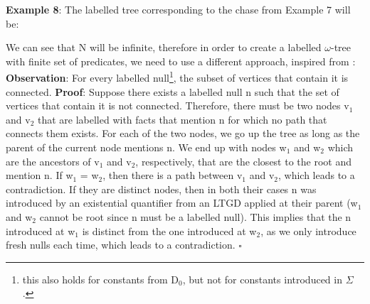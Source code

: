 \documentclass[11pt, a4paper, dvipsnames]{article}
\begin{document}
\textbf{Example 8}: The labelled tree corresponding to the chase from Example 7 will be:\newline
\begin{center}
\end{center}
We can see that N will be infinite, therefore in order to create a labelled $\omega$-tree with finite set of predicates, we need to use a different approach, inspired from \cite{decidable}: \newline
\textbf{Observation}: For every labelled null\footnote{this also holds for constants from D$_{0}$, but not for constants introduced in $\Sigma$.}, the subset of vertices that contain it is connected. \newline
\textbf{Proof}: Suppose there exists a labelled null n such that the set of vertices that contain it is not connected. Therefore, there must be two nodes v$_{1}$ and v$_{2}$ that are labelled with facts that mention n for which no path that connects them exists. For each of the two nodes, we go up the tree as long as the parent of the current node mentions n. We end up with nodes w$_{1}$ and w$_{2}$ which are the ancestors of v$_{1}$ and v$_{2}$, respectively, that are the closest to the root and mention n. If w$_{1}$ = w$_{2}$, then there is a path between v$_{1}$ and v$_{2}$, which leads to a contradiction. If they are distinct nodes, then in both their cases n was introduced by an existential quantifier from an LTGD applied at their parent (w$_{1}$ and w$_{2}$ cannot be root since n must be a labelled null). This implies that the n introduced at w$_{1}$ is distinct from the one introduced at w$_{2}$, as we only introduce fresh nulls each time, which leads to a contradiction.  $\square$\newline
\end{document}
